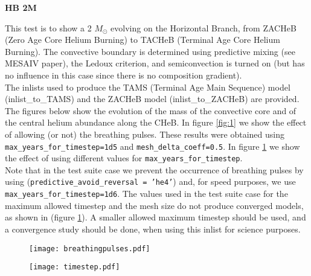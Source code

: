 \documentclass{article}
\begin{document}
\begin{center}
\begin{Large}
\textbf{HB 2M}\\
\end{Large}
\end{center}

This test is to show a 2 $M_\odot$ evolving on the Horizontal Branch, from ZACHeB (Zero Age Core Helium Burning) to TACHeB (Terminal Age Core Helium Burning). The convective boundary is determined using predictive mixing (see MESAIV paper), the Ledoux criterion, and semiconvection is turned on (but has no influence in this case since there is no composition gradient).\\

The inlists used to produce the TAMS (Terminal Age Main Sequence) model (inlist\_to\_TAMS) and the ZACHeB model (inlist\_to\_ZACHeB) are provided.\\

The figures below show the evolution of the mass of the convective core and of the central helium abundance along the CHeB. In  figure \ref{fig:1} we show the effect of allowing (or not) the breathing pulses. These results were obtained using \texttt{max\_years\_for\_timestep=1d5} and \texttt{mesh\_delta\_coeff=0.5}.  In figure \ref{fig:2} we show the effect of using different values for \texttt{max\_years\_for\_timestep}. \\

Note that in the test suite case we prevent the occurrence of breathing pulses by using (\texttt{predictive\_avoid\_reversal = 'he4'}) and, for speed purposes, we use \texttt{max\_years\_for\_timestep=1d6}. The values used in the test suite case for the maximum allowed timestep and the mesh size do not produce converged models, as shown in (figure \ref{fig:2}). A smaller allowed maximum timestep should be used, and a convergence study should be done, when using this inlist for science purposes.\\

\begin{figure}[H]
\begin{minipage}[b]{0.5\linewidth}
\centering
\texttt{[image: breathingpulses.pdf]}
\caption{}
\label{fig:1}
\end{minipage}
\hspace{0cm}
\begin{minipage}[b]{0.5\linewidth}
\centering
\texttt{[image: timestep.pdf]}
\caption{}
\label{fig:2}
\end{minipage}
\end{figure}

\pagebreak
\end{document}
